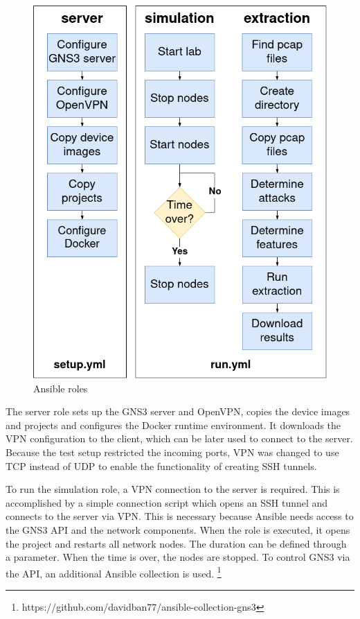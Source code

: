 \documentclass[conference]{IEEEtran}
\begin{document}
\begin{figure}[htbp]
\centerline{\includegraphics[scale=0.33]{ansible.png}}
\caption{Ansible roles}
\label{ansible}
\end{figure}

The server role sets up the GNS3 server and OpenVPN, copies the device images and projects and configures the Docker runtime environment. It downloads the VPN configuration to the client, which can be later used to connect to the server. Because the test setup restricted the incoming ports, VPN was changed to use TCP instead of UDP to enable the functionality of creating SSH tunnels.

To run the simulation role, a VPN connection to the server is required. This is accomplished by a simple connection script which opens an SSH tunnel and connects to the server via VPN. This is necessary because Ansible needs access to the GNS3 API and the network components. When the role is executed, it opens the project and restarts all network nodes. The duration can be defined through a parameter. When the time is over, the nodes are stopped. To control GNS3 via the API, an additional Ansible collection is used. \footnote{https://github.com/davidban77/ansible-collection-gns3}
\end{document}
